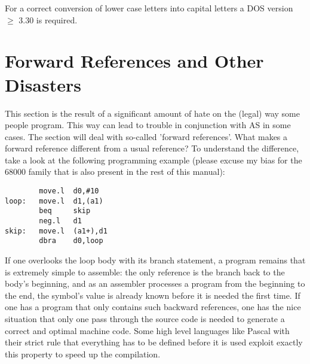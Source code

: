 \documentclass[12pt,twoside]{report}
\begin{document}
For a correct conversion  of lower case letters
into capital letters a DOS version $\geq$ 3.30 is required.


\section{Forward References and Other Disasters}

This section is the result of a significant amount of hate on the
(legal) way some people program.  This way can lead to trouble in
conjunction with AS in some cases.  The section will deal with
so-called 'forward references'.  What makes a forward reference
different from a usual reference?  To understand the difference, take
a look at the following programming example (please excuse my bias
for the 68000 family that is also present in the rest of this
manual):
\begin{verbatim}
        move.l  d0,#10
loop:   move.l  d1,(a1)
        beq     skip   
        neg.l   d1     
skip:   move.l  (a1+),d1
        dbra    d0,loop 
\end{verbatim}
If one overlooks the loop body with its branch statement, a program
remains that is extremely simple to assemble: the only reference is
the branch back to the body's beginning, and as an assembler
processes a program from the beginning to the end, the symbol's value
is already known before it is needed the first time.  If one has a
program that only contains such backward references, one has the nice
situation that only one pass through the source code is needed to
generate a correct and optimal machine code.  Some high level
languages like Pascal with their strict rule that everything has to
be defined before it is used exploit exactly this property to speed
up the compilation.
\end{document}
